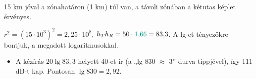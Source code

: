15 km jóval a zónahatáron (1 km) túl van, a távoli zónában a kétutas képlet érvényes.

\begin{center}\end{center}

$r^2=(15\cdot10^3)^2=2{,}25\cdot10^8$, $h_Th_R=50\cdot{\cd{1{,}66}}=83{,}3$. A lg-et tényezőkre bontjuk, a megadott logaritmusokkal.

\begin{center}\end{center}

\begin{center}\end{center}

\begin{center}\end{center}
\begin{eredmeny}

\begin{center}\end{center}
\end{eredmeny}
\begin{tipp}[Ellenőrzés]
\begin{itemize}
\item A kézírás $20\lg83{,}3$ helyett 40-et ír (a „lg 830 $\approx$ 3” durva tippjével), így 111 dB-t kap. Pontosan $\lg830=2{,}92$.
\end{itemize}
\end{tipp}


